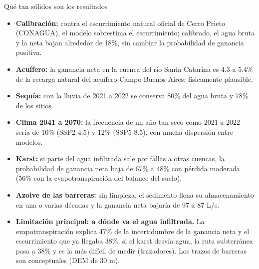 \documentclass[aspectratio=169,10pt]{beamer}
\begin{document}
\begin{frame}{Qué tan sólidos son los resultados}
\footnotesize
\begin{itemize}
  \item \textbf{Calibración:} contra el escurrimiento natural oficial de Cerro Prieto (CONAGUA), el modelo sobrestima el escurrimiento; calibrado, el agua bruta y la neta bajan alrededor de 18\%, sin cambiar la probabilidad de ganancia positiva.
  \item \textbf{Acuífero:} la ganancia neta en la cuenca del río Santa Catarina es 4.3 a 5.4\% de la recarga natural del acuífero Campo Buenos Aires: físicamente plausible.
  \item \textbf{Sequía:} con la lluvia de 2021 a 2022 se conserva 80\% del agua bruta y 78\% de los sitios.
  \item \textbf{Clima 2041 a 2070:} la frecuencia de un año tan seco como 2021 a 2022 sería de 10\% (SSP2-4.5) y 12\% (SSP5-8.5), con mucha dispersión entre modelos.
  \item \textbf{Karst:} si parte del agua infiltrada sale por fallas a otras cuencas, la probabilidad de ganancia neta baja de 67\% a 48\% con pérdida moderada (56\% con la evapotranspiración del balance del suelo).
  \item \textbf{Azolve de las barreras:} sin limpieza, el sedimento llena su almacenamiento en una o varias décadas y la ganancia neta bajaría de 97 a 87 L/s.
  \item \textbf{Limitación principal: a dónde va el agua infiltrada.} La evapotranspiración explica 47\% de la incertidumbre de la ganancia neta y el escurrimiento que ya llegaba 38\%; si el karst desvía agua, la ruta subterránea pasa a 38\% y es la más difícil de medir (trazadores). Los trazos de barreras son conceptuales (DEM de 30 m).
\end{itemize}
\end{frame}
\end{document}
